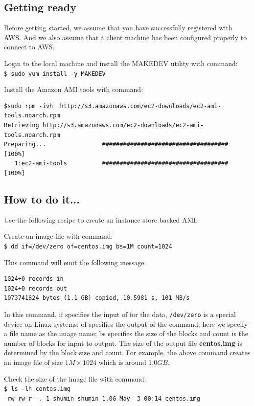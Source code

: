 \subsection*{Getting ready}
Before getting started, we assume that you have successfully registered with AWS. And we also assume that a client machine has been configured properly to connect to AWS.

Login to the local machine and install the MAKEDEV utility with command: \\
\verb|$ sudo yum install -y MAKEDEV|

Install the Amazon AMI tools with command:
\lstset{style=bashstyle}
\begin{lstlisting}
$sudo rpm -ivh  http://s3.amazonaws.com/ec2-downloads/ec2-ami-tools.noarch.rpm
Retrieving http://s3.amazonaws.com/ec2-downloads/ec2-ami-tools.noarch.rpm
Preparing...                #################################### [100%]
   1:ec2-ami-tools          #################################### [100%]
\end{lstlisting}

\subsection*{How to do it...}
Use the following recipe to create an instance store backed AMI:

Create an image file with command: \\
\verb|$ dd if=/dev/zero of=centos.img bs=1M count=1024|

This command will emit the following message:
\lstset{style=bashstyle}
\begin{lstlisting}
1024+0 records in
1024+0 records out
1073741824 bytes (1.1 GB) copied, 10.5981 s, 101 MB/s
\end{lstlisting}
In this command, if specifies the input of for the data, \verb|/dev/zero| is a special device on Linux systems; of specifies the output of the command, here we specify a file name as the image name; bs specifies the size of the blocks and count is the number of blocks for input to output. The size of the output file \textbf{centos.img} is determined by the block size and count. For example, the above command creates an image file of size $1M \times 1024$ which is around $1.0GB$.

Check the size of the image file with command:\\
\verb|$ ls -lh centos.img| \\
\verb|-rw-rw-r--. 1 shumin shumin 1.0G May  3 00:14 centos.img|

